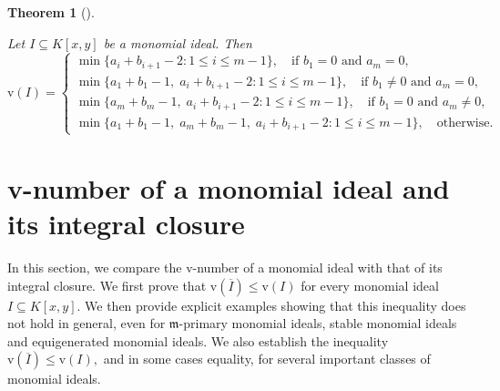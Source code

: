 \documentclass[11pt,reqno,a4paper]{amsart}
\newtheorem{theorem}{Theorem}[section]
\theoremstyle{definition}
\begin{document}
 

\begin{theorem}[{\cite[Theorem 5.6]{FicarraSgroi23}}]\label{thm:FicarraSgroi23}



\noindent Let $I \subseteq  K[x, y] $ be a monomial ideal. Then
\[
\mathrm{v}(I) = \left\{
\begin{array}{ll}
\min \{a_i + b_{i+1} - 2 : 1 \leq i \leq m-1\}, \quad \text{if }   b_1 = 0 \text{ and } a_m = 0, \\[4pt]
\min \{a_1 + b_1 - 1,\; a_i + b_{i+1} - 2 : 1 \leq i \leq m-1\}, \quad \text {if } b_1 \neq 0 \text{ and } a_m = 0, \\[4pt]
\min \{a_m + b_m - 1,\; a_i + b_{i+1} - 2 : 1 \leq i \leq m-1\}, \quad \text {if } b_1 = 0 \text{ and } a_m \neq 0, \\[4pt]
\min \{a_1 + b_1 - 1,\; a_m + b_m - 1,\; a_i + b_{i+1} - 2 : 1 \leq i \leq m-1\},  \quad \text{otherwise}.
\end{array}
\right.
\]


\end{theorem}





\section{v-number of a monomial ideal and its integral closure}

\noindent In this section, we compare the $\mathrm{v}$-number of a monomial ideal with that of its integral closure. We first prove that
\(
\mathrm{v}(\overline{I})\leq \mathrm{v}(I)
\)
for every monomial ideal $I\subseteq K[x,y]$. We then provide explicit examples showing that this inequality does not hold in general, even for $\mathfrak{m}$-primary monomial ideals, stable monomial ideals and equigenerated monomial ideals. We also establish the inequality
\(
\mathrm{v}(\overline{I})\leq \mathrm{v}(I),
\)
and in some cases equality, for several important classes of monomial ideals.
\end{document}
